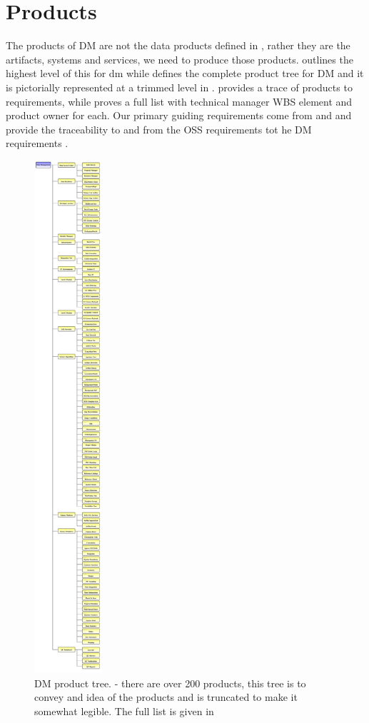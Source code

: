 \section{Products \label{sect:products}}

The products of DM are not the data products defined in , rather they are the artifacts, systems and services,  we need to produce those products.  outlines the highest level of this for dm while    defines the complete product tree for DM and it is pictorially represented at a trimmed level in  . 
 provides a trace of products to requirements, while  proves a full list with technical manager WBS element and product owner for each.  
Our primary guiding requirements come from  and  and  provide the traceability to and from the OSS requirements tot he DM requirements . 

\begin{figure}[htbp]
	\begin{center}
		 \includegraphics[height=19cm]{ProductTree}
		 \caption{DM product tree. \label{fig:prods}- there are over 200 products, this tree is to convey and idea of the products and is truncated to make it somewhat legible. 
		 The full list is given in 
	 }
		  
	 \end{center}
 \end{figure}

